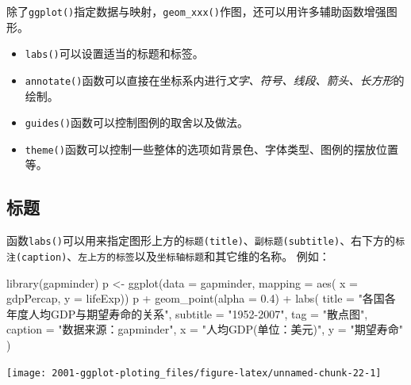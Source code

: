 \documentclass[
]{book}
\newenvironment{Shaded}{\begin{snugshade}}{\end{snugshade}}
\newcommand{\AttributeTok}[1]{\textcolor[rgb]{0.77,0.63,0.00}{#1}}
\newcommand{\FloatTok}[1]{\textcolor[rgb]{0.00,0.00,0.81}{#1}}
\newcommand{\FunctionTok}[1]{\textcolor[rgb]{0.00,0.00,0.00}{#1}}
\newcommand{\NormalTok}[1]{#1}
\newcommand{\OtherTok}[1]{\textcolor[rgb]{0.56,0.35,0.01}{#1}}
\newcommand{\SpecialCharTok}[1]{\textcolor[rgb]{0.00,0.00,0.00}{#1}}
\newcommand{\StringTok}[1]{\textcolor[rgb]{0.31,0.60,0.02}{#1}}
\providecommand{\tightlist}{%
  \setlength{\itemsep}{0pt}\setlength{\parskip}{0pt}}
\begin{document}
除了\texttt{ggplot()}指定数据与映射，\texttt{geom\_xxx()}作图，还可以用许多辅助函数增强图形。

\begin{itemize}
\tightlist
\item
  \texttt{labs()}可以设置适当的标题和标签。
\item
  \texttt{annotate()}函数可以直接在坐标系内进行\emph{文字、符号、线段、箭头、长方形}的绘制。
\item
  \texttt{guides()}函数可以控制图例的取舍以及做法。
\item
  \texttt{theme()}函数可以控制一些整体的选项如背景色、字体类型、图例的摆放位置等。
\end{itemize}

\hypertarget{ux6807ux9898}{%
\subsection{标题}\label{ux6807ux9898}}

函数\texttt{labs()}可以用来指定图形上方的\texttt{标题(title)}、\texttt{副标题(subtitle)}、右下方的\texttt{标注(caption)}、\texttt{左上方的标签}以及\texttt{坐标轴标题}和其它维的名称。
例如：

\begin{Shaded}
\begin{Highlighting}[]
\FunctionTok{library}\NormalTok{(gapminder)}
\NormalTok{p }\OtherTok{\textless{}{-}} \FunctionTok{ggplot}\NormalTok{(}\AttributeTok{data =}\NormalTok{ gapminder,}
  \AttributeTok{mapping =} \FunctionTok{aes}\NormalTok{(}
    \AttributeTok{x =}\NormalTok{ gdpPercap,}
    \AttributeTok{y =}\NormalTok{ lifeExp))}
\NormalTok{p }\SpecialCharTok{+} \FunctionTok{geom\_point}\NormalTok{(}\AttributeTok{alpha =} \FloatTok{0.4}\NormalTok{) }\SpecialCharTok{+} 
  \FunctionTok{labs}\NormalTok{(}
    \AttributeTok{title =} \StringTok{"各国各年度人均GDP与期望寿命的关系"}\NormalTok{,}
    \AttributeTok{subtitle =} \StringTok{"1952{-}2007"}\NormalTok{,}
    \AttributeTok{tag =} \StringTok{"散点图"}\NormalTok{,}
    \AttributeTok{caption =} \StringTok{"数据来源：gapminder"}\NormalTok{,}
    \AttributeTok{x =} \StringTok{"人均GDP(单位：美元)"}\NormalTok{,}
    \AttributeTok{y =} \StringTok{"期望寿命"}
\NormalTok{  )}
\end{Highlighting}
\end{Shaded}

\begin{center}\texttt{[image: 2001-ggplot-ploting\_files/figure-latex/unnamed-chunk-22-1]} \end{center}
\end{document}
